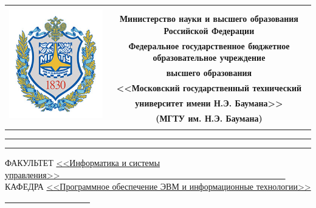 \documentclass[12pt, a4paper]{report}
\begin{document}
  \begin{titlepage}
  	
  	\begin{table}[H]
  		\centering
  		\footnotesize
  		\begin{tabular}{cc}
  			\multirow{8}{*}{\includegraphics[scale=0.35]{img/bmstu.jpg}}
  			& \\
  			& \\
  			& \textbf{Министерство науки и высшего образования Российской Федерации} \\
  			& \textbf{Федеральное государственное бюджетное образовательное учреждение} \\
  			& \textbf{высшего образования} \\
  			& \textbf{<<Московский государственный технический} \\
  			& \textbf{университет имени Н.Э. Баумана>>} \\
  			& \textbf{(МГТУ им. Н.Э. Баумана)} \\
  			& \textbf{} \\
  		\end{tabular}
  	\end{table}
  	
  	\vspace{-2.5cm}
  	
  	\begin{flushleft}
  		\rule[-1cm]{\textwidth}{3pt}
  		\rule{\textwidth}{1pt}
  	\end{flushleft}
  	
  	\begin{flushleft}
  		\small
  		ФАКУЛЬТЕТ
  		\underline{<<Информатика и системы управления>>\ \ \ \ \ \ \ 
  			\ \ \ \ \ \ \ \ \ \ \ \ \ \ \ \ \ \ \ \ \ \ \ \ \ \ \ \ \ \ \ 
  			\ \ \ \ \ \ \ \ \ \ \ \ \ \ \ } \\
  		КАФЕДРА
  		\underline{<<Программное обеспечение ЭВМ и
  			информационные технологии>>
  			\ \ \ \ \ \ \ \ \ \ \ \ \ \ \ \ \ \ \ \ }
  	\end{flushleft}
  	

\end{titlepage}
\end{document}
